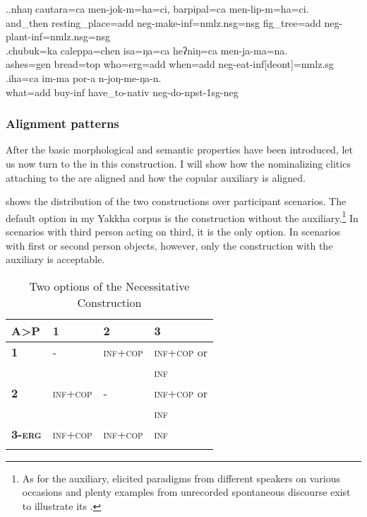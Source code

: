 \ex.\ag.nhaŋ     cautara=ca  men-jok-m=ha=ci,  barpipal=ca  men-lip-m=ha=ci.\\
and\_then resting\_place{\sc =add} {\sc neg-}make{\sc -inf=nmlz.nsg=nsg} fig\_tree{\sc =add} {\sc neg-}plant{\sc -inf=nmlz.nsg=nsg}\\
\bg.chubuk=ka    caleppa=chen   isa=ŋa=ca          heʔniŋ=ca        men-ja-ma=na.\\
ashes{\sc =gen} bread{\sc =top} who{\sc =erg=add} when{\sc =add} {\sc neg-}eat{\sc -inf[deont]=nmlz.sg}\\
 
\bg.iha=ca  im-ma     por-a           n-joŋ-me-ŋa-n.\\
what{\sc =add} buy{\sc -inf} have\_to{\sc -nativ} {\sc neg-}do{\sc -npst-1sg-neg}\\
  



\subsubsection{Alignment patterns}

After the basic morphological and semantic properties have been introduced, let us now turn to the  in this construction. I will show how the nominalizing clitics attaching to the  are aligned and how the copular auxiliary is aligned. 

 shows the distribution of the two constructions over participant scenarios. The default option in my Yakkha corpus  is the construction without the auxiliary.\footnote{As for the auxiliary, elicited paradigms from different speakers on various occasions and plenty examples from unrecorded spontaneous discourse exist to illustrate its .} In scenarios with third person acting on third, it is the only option. In scenarios with first or second person objects, however, only the construction with the auxiliary is acceptable.

\begin{table}
\centering
\begin{tabular}{llll}
\lsptoprule
{\bf A>P}&{\bf 1}&{\bf 2}&{\bf 3}\\
\midrule
 {\bf 1}	&-&\textsc{inf}+\textsc{cop}&\textsc{inf}+\textsc{cop} or\\
 &&&\textsc{inf}\\
 \midrule
 {\bf 2}&\textsc{inf}+\textsc{cop}&-&\textsc{inf}+\textsc{cop} or\\
 &&&\textsc{inf}\\
 \midrule
 {\bf 3-\textsc{erg}}&\textsc{inf}+\textsc{cop}&\textsc{inf}+\textsc{cop}&\textsc{inf}\\
 \lspbottomrule
\end{tabular}
\caption{Two options of the Necessitative Construction}\label{cop-options}
\end{table}


